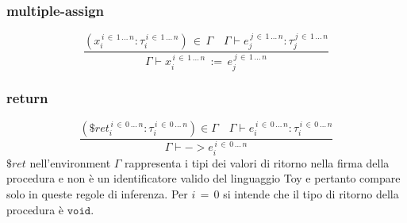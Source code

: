 \documentclass[a4paper,12pt]{article}
\newcommand\resw[1]{\mathtt{#1}}
\newcommand\mi[1]{\mathit{#1}}
\begin{document}
    \subsubsection{multiple-assign}
     \[
        \frac{(\mi{x}_{i}^{\, i \, \in \, 1 \, \dots \, n} \colon \tau_{i}^{\, i \, \in \, 1 \, \dots \, n}) \, \in \, \Gamma \quad \Gamma \vdash \mi{e}_{j}^{\, j \, \in \, 1 \, \dots \, n}%
        \colon \tau_{j}^{\, j \, \in \, 1 \, \dots \, n}}%
        {\Gamma \vdash \mi{x}_{i}^{\, i \, \in \, 1 \, \dots \, n} \, \resw{:=} \, \mi{e}_{j}^{\, j \, \in \, 1 \, \dots \, n}}
    \]
    \subsubsection{return}
    \[
    	\frac{(\$\mi{ret}_{i}^{\, i \, \in \, 0 \, \dots \, n} \colon \tau_{i}^{\, i \, \in \, 0 \, \dots \, n}) \in %
	\Gamma \quad \Gamma \vdash \mi{e}_{i}^{\, i \, \in \, 0 \, \dots \, n} \colon \tau_{i}^{\, i \, \in \, 0 \, \dots \, n}}%
	{\Gamma \vdash \resw{-\!\!>} \mi{e}_{i}^{\, i \, \in \, 0 \, \dots \, n}}
    \]
	$\$ret$ nell'environment $\Gamma$ rappresenta i tipi dei valori di ritorno nella firma della procedura e non è un identificatore
	valido del linguaggio Toy e pertanto compare solo in queste regole di inferenza.
	Per $i\, = \, 0$ si intende che il tipo di ritorno della procedura è $\resw{void}$.
	\newpage
\end{document}
